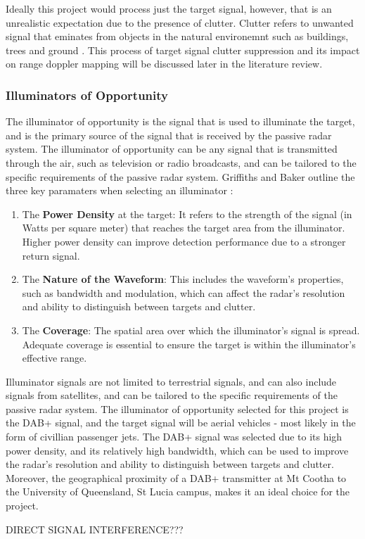 \documentclass[12pt,a4paper]{article}
\begin{document}
\par \vspace{0.5cm} 
\noindent Ideally this project would process just the target signal, however, that is an unrealistic expectation due to the presence of clutter. Clutter refers to unwanted signal that eminates from objects in the natural environemnt such as buildings, trees and ground \cite{zhang2023intelligent}. This process of target signal clutter suppression and its impact on range doppler mapping will be discussed later in the literature review.  

\subsubsection{Illuminators of Opportunity}
The illuminator of opportunity is the signal that is used to illuminate the target, and is the primary source of the signal that is received by the passive radar system. The illuminator of opportunity can be any signal that is transmitted through the air, such as television or radio broadcasts, and can be tailored to the specific requirements of the passive radar system. Griffiths and Baker outline the three key paramaters when selecting an illuminator \cite{INTRO2017}:
\begin{enumerate}[label=\arabic*.]
    \item The \textbf{Power Density} at the target: It refers to the strength of the signal (in Watts per square meter) that reaches the target area from the illuminator. Higher power density can improve detection performance due to a stronger return signal.
    \item The \textbf{Nature of the Waveform}: This includes the waveform's properties, such as bandwidth and modulation, which can affect the radar's resolution and ability to distinguish between targets and clutter.
    \item The \textbf{Coverage}: The spatial area over which the illuminator's signal is spread. Adequate coverage is essential to ensure the target is within the illuminator's effective range.
\end{enumerate}
Illuminator signals are not limited to terrestrial signals, and can also include signals from satellites, and can be tailored to the specific requirements of the passive radar system. The illuminator of opportunity selected for this project is the DAB+  signal, and the target signal will be aerial vehicles - most likely in the form of civillian passenger jets. The DAB+ signal was selected due to its high power density, and its relatively high bandwidth, which can be used to improve the radar's resolution and ability to distinguish between targets and clutter. Moreover, the geographical proximity of a DAB+ transmitter at Mt Cootha to the University of Queensland, St Lucia campus, makes it an ideal choice for the project.
\par \vspace{0.5cm} 
\noindent DIRECT SIGNAL INTERFERENCE???
\end{document}
